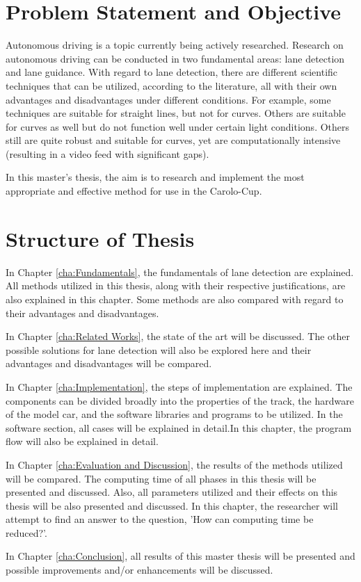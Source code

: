 \section{Problem Statement and Objective}\label{sec:Problem Statement and Objective}


Autonomous driving is a topic currently being actively researched. Research on autonomous driving can be conducted in two fundamental areas: lane detection and lane guidance. With regard to lane detection, there are different scientific techniques that can be utilized, according to the literature, all with their own advantages and disadvantages under different conditions. For example, some techniques are suitable for straight lines, but not for curves. Others are suitable for curves as well but do not function well under certain light conditions. Others still are quite robust and suitable for curves, yet are computationally intensive (resulting in a video feed with significant gaps). 

In this master's thesis, the aim is to research and implement the most appropriate and effective method for use in the Carolo-Cup.


\section{Structure of Thesis}\label{sec:Structure of Thesis}


In Chapter \ref{cha:Fundamentals}, the fundamentals of lane detection are explained. All methods utilized in this thesis, along with their respective justifications, are also explained in this chapter. Some methods are also compared with regard to their advantages and disadvantages.

In Chapter \ref{cha:Related Works}, the state of the art will be discussed. The other possible solutions for lane detection will also be explored here and their advantages and disadvantages will be compared.

In Chapter \ref{cha:Implementation}, the steps of implementation are explained. The components can be divided broadly into the properties of the track, the hardware of the model car, and the software libraries and programs to be utilized. In the software section, all cases will be explained in detail.In this chapter, the program flow will also be explained in detail.

In Chapter \ref{cha:Evaluation and Discussion}, the results of the methods utilized will be compared. The computing time of all phases in this thesis will be presented and discussed. Also, all parameters utilized and their effects on this thesis will be also presented and discussed. In this chapter, the researcher will attempt to find an answer to the question, 'How can computing time be reduced?'.


In Chapter \ref{cha:Conclusion}, all results of this master thesis will be presented and possible improvements and/or enhancements will be discussed.


